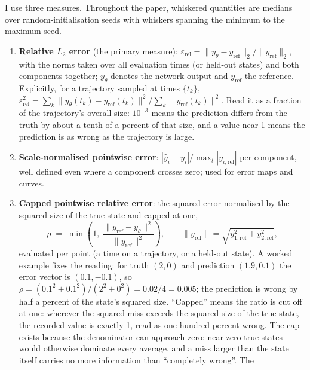 \documentclass[11pt,a4paper]{article}
\begin{document}
I use three measures. Throughout the paper, whiskered quantities are
medians over random-initialisation seeds with whiskers spanning the
minimum to the maximum seed.
\begin{enumerate}
  \item \textbf{Relative $L_2$ error} (the primary measure):
  $\varepsilon_{\mathrm{rel}} =
  \lVert y_\theta - y_{\mathrm{ref}} \rVert_2 /
  \lVert y_{\mathrm{ref}} \rVert_2$,
  with the norms taken over all evaluation times (or held-out states) and
  both components together; $y_\theta$ denotes the network output and
  $y_{\mathrm{ref}}$ the reference. Explicitly, for a trajectory sampled
  at times $\{t_k\}$,
  $\varepsilon_{\mathrm{rel}}^2 =
  \sum_k \lVert y_\theta(t_k) - y_{\mathrm{ref}}(t_k)\rVert^2 \big/
  \sum_k \lVert y_{\mathrm{ref}}(t_k)\rVert^2$.
  Read it as a fraction of the trajectory's overall size: $10^{-3}$ means
  the prediction differs from the truth by about a tenth of a percent of
  that size, and a value near 1 means the prediction is as wrong as the
  trajectory is large.
  \item \textbf{Scale-normalised pointwise error}:
  $|\hat y_i - y_i| / \max_t |y_{i,\mathrm{ref}}|$ per component, well
  defined even where a component crosses zero; used for error maps and
  curves.
  \item \textbf{Capped pointwise relative error}: the squared error
  normalised by the squared size of the true state and capped at one,
  \begin{equation}
    \rho \;=\; \min\!\left(1,\;
      \frac{\lVert y_{\mathrm{ref}} - y_\theta \rVert^2}
           {\lVert y_{\mathrm{ref}} \rVert^2}\right),
    \qquad
    \lVert y_{\mathrm{ref}} \rVert = \sqrt{y_{1,\mathrm{ref}}^2 + y_{2,\mathrm{ref}}^2},
    \label{eq:rho}
  \end{equation}
  evaluated per point (a time on a trajectory, or a held-out state). A
  worked example fixes the reading: for truth $(2, 0)$ and prediction
  $(1.9, 0.1)$ the error vector is $(0.1, -0.1)$, so
  $\rho = (0.1^2 + 0.1^2)/(2^2 + 0^2) = 0.02/4 = 0.005$; the prediction
  is wrong by half a percent of the state's squared size. ``Capped''
  means the ratio is cut off at one: wherever the squared miss exceeds
  the squared size of the true state, the recorded value is exactly 1,
  read as one hundred percent wrong. The cap exists because the
  denominator can approach zero: near-zero true states would otherwise
  dominate every average, and a miss larger than the state itself carries
  no more information than ``completely wrong''. The

\end{enumerate}
\end{document}
